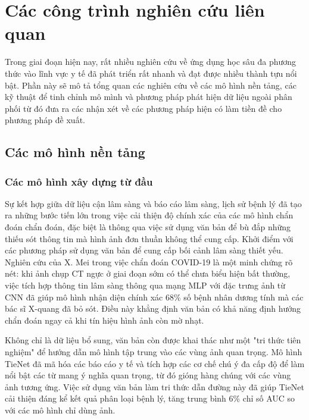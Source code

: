 \chapter{Các công trình nghiên cứu liên quan}
\label{Chapter2}

Trong giai đoạn hiện nay, rất nhiều nghiên cứu về ứng dụng học sâu đa phương thức vào lĩnh vực y tế đã phát triển rất nhanh và đạt được nhiều thành tựu nổi bật. Phần này sẽ mô tả tổng quan các nghiên cứu về các mô hình nền tảng, các kỹ thuật để tinh chỉnh mô mình và phương pháp phát hiện dữ liệu ngoài phân phối từ đó đưa ra các nhận xét về các phương pháp hiện có làm tiền đề cho phương pháp đề xuất.

\section{Các mô hình nền tảng}

\subsection{Các mô hình xây dựng từ đầu}

Sự kết hợp giữa dữ liệu cận lâm sàng và báo cáo lâm sàng, lịch sử bệnh lý đã tạo ra những bước tiến lớn trong việc cải thiện độ chính xác của các mô hình chẩn đoán chẩn đoán, đặc biệt là thông qua việc sử dụng văn bản để bù đắp những thiếu sót thông tin mà hình ảnh đơn thuần không thể cung cấp. Khởi điểm với các phương pháp sử dụng văn bản để cung cấp bối cảnh lâm sàng thiết yếu. Nghiên cứu của X. Mei \cite{XMei} trong việc chẩn đoán COVID-19 là một minh chứng rõ nét: khi ảnh chụp CT ngực ở giai đoạn sớm có thể chưa biểu hiện bất thường, việc tích hợp thông tin lâm sàng thông qua mạng MLP với đặc trưng ảnh từ CNN đã giúp mô hình nhận diện chính xác 68\% số bệnh nhân dương tính mà các bác sĩ X-quang đã bỏ sót. Điều này khẳng định văn bản có khả năng định hướng chẩn đoán ngay cả khi tín hiệu hình ảnh còn mờ nhạt.

Không chỉ là dữ liệu bổ sung, văn bản còn được khai thác như một "tri thức tiên nghiệm" để hướng dẫn mô hình tập trung vào các vùng ảnh quan trọng. Mô hình TieNet \cite{TieNet} đã mã hóa các báo cáo y tế và tích hợp các cơ chế chú ý đa cấp độ để làm nổi bật các từ mang ý nghĩa quan trọng, từ đó gióng hàng chúng với các vùng ảnh tương ứng. Việc sử dụng văn bản làm tri thức dẫn đường này đã giúp TieNet cải thiện đáng kể kết quả phân loại bệnh lý, tăng trung bình 6\% chỉ số AUC so với các mô hình chỉ dùng ảnh.

